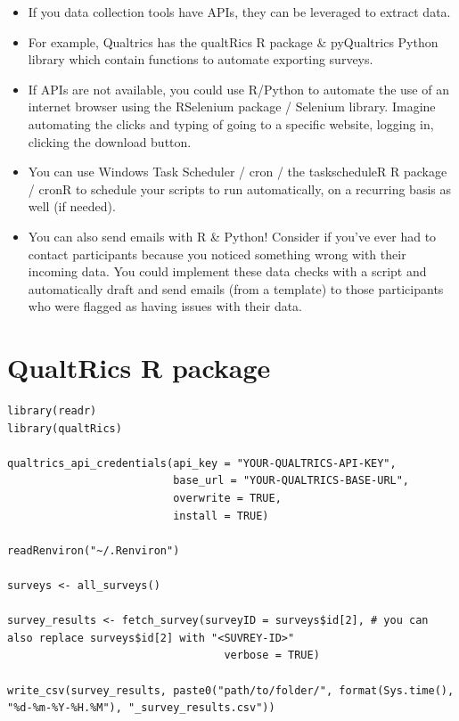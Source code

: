 \documentclass[
  letterpaper,
  DIV=11,
  numbers=noendperiod]{scrreprt}
\begin{document}

\begin{itemize}
\item
  If you data collection tools have APIs, they can be leveraged to
  extract data.
\item
  For example, Qualtrics has the qualtRics R package \& pyQualtrics
  Python library which contain functions to automate exporting surveys.
\item
  If APIs are not available, you could use R/Python to automate the use
  of an internet browser using the RSelenium package / Selenium library.
  Imagine automating the clicks and typing of going to a specific
  website, logging in, clicking the download button.
\item
  You can use Windows Task Scheduler / cron / the taskscheduleR R
  package / cronR to schedule your scripts to run automatically, on a
  recurring basis as well (if needed).
\item
  You can also send emails with R \& Python! Consider if you've ever had
  to contact participants because you noticed something wrong with their
  incoming data. You could implement these data checks with a script and
  automatically draft and send emails (from a template) to those
  participants who were flagged as having issues with their data.
\end{itemize}

\hypertarget{qualtrics-r-package}{%
\section*{QualtRics R package}\label{qualtrics-r-package}}


\begin{verbatim}
library(readr)
library(qualtRics)

qualtrics_api_credentials(api_key = "YOUR-QUALTRICS-API-KEY", 
                          base_url = "YOUR-QUALTRICS-BASE-URL",
                          overwrite = TRUE,
                          install = TRUE)

readRenviron("~/.Renviron")

surveys <- all_surveys() 

survey_results <- fetch_survey(surveyID = surveys$id[2], # you can also replace surveys$id[2] with "<SUVREY-ID>" 
                                  verbose = TRUE)

write_csv(survey_results, paste0("path/to/folder/", format(Sys.time(), "%d-%m-%Y-%H.%M"), "_survey_results.csv"))
\end{verbatim}
\end{document}
